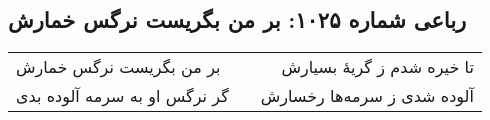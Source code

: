 \begin{center}
\section*{رباعی شماره ۱۰۲۵: بر من بگریست نرگس خمارش}
\label{sec:1025}
\begin{longtable}{l p{0.5cm} r}
بر من بگریست نرگس خمارش
&&
تا خیره شدم ز گریهٔ بسیارش
\\
گر نرگس او به سرمه آلوده بدی
&&
آلوده شدی ز سرمه‌ها رخسارش
\\
\end{longtable}
\end{center}
